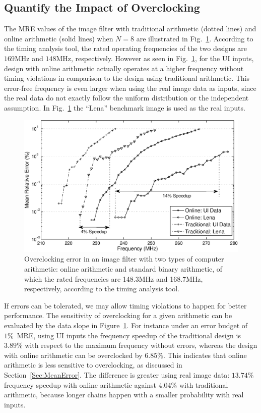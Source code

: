 \documentclass[journal]{IEEEtran}
\begin{document}
\subsection{Quantify the Impact of Overclocking}
The MRE values of the image filter with traditional arithmetic (dotted lines) and online arithmetic (solid lines) when $N=8$ are illustrated in Fig.~\ref{Fig:MRE_ImageFilter}. According to the timing analysis tool, the rated operating frequencies of the two designs are $169$MHz and $148$MHz, respectively. However as seen in Fig.~\ref{Fig:MRE_ImageFilter}, for the UI inputs, design with online arithmetic actually operates at a higher frequency without timing violations in comparison to the design using traditional arithmetic. This error-free frequency is even larger when using the real image data as inputs, since the real data do not exactly follow the uniform distribution or the independent assumption. In Fig.~\ref{Fig:MRE_ImageFilter} the ``Lena'' benchmark image is used as the real inputs.

\begin{figure}
    \centering
    \includegraphics[width=.48\textwidth]{./Figures/Exps/MRE.eps}
    \caption{Overclocking error in an image filter with two types of computer arithmetic: online arithmetic and standard binary arithmetic, of which the rated frequencies are 148.3MHz and 168.7MHz, respectively, according to the timing analysis tool.}
    \label{Fig:MRE_ImageFilter}
\end{figure}

If errors can be tolerated, we may allow timing violations to happen for better performance. The sensitivity of overclocking for a given arithmetic can be evaluated by the data slope in Figure~\ref{Fig:MRE_ImageFilter}. For instance under an error budget of $1\%$~MRE, using UI inputs the frequency speedup of the traditional design is $3.89\%$ with respect to the maximum frequency without errors, whereas the design with online arithmetic can be overclocked by $6.85\%$. This indicates that online arithmetic is less sensitive to overclocking, as discussed in Section~\ref{Sec:MeanError}. The difference is greater using real image data: $13.74\%$ frequency speedup with online arithmetic against $4.04\%$ with traditional arithmetic, because longer chains happen with a smaller probability with real inputs.
\end{document}
